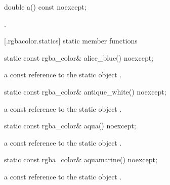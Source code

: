 %
%
\begin{itemdecl}
	double a() const noexcept;
\end{itemdecl}
\begin{itemdescr}
	\pnum
	\returns
	.
\end{itemdescr}

 [\iotwod.rgbacolor.statics] { static member functions}

\begin{itemdecl}
    static const rgba_color& alice_blue() noexcept;
\end{itemdecl}
\begin{itemdescr}
    \pnum
    \returns
    a const reference to the static  object .
\end{itemdescr}

\begin{itemdecl}
    static const rgba_color& antique_white() noexcept;
\end{itemdecl}
\begin{itemdescr}
    \pnum
    \returns
    a const reference to the static  object .
\end{itemdescr}

\begin{itemdecl}
    static const rgba_color& aqua() noexcept;
\end{itemdecl}
\begin{itemdescr}
    \pnum
    \returns
    a const reference to the static  object .
\end{itemdescr}

\begin{itemdecl}
    static const rgba_color& aquamarine() noexcept;
\end{itemdecl}
\begin{itemdescr}
    \pnum
    \returns
    a const reference to the static  object .
\end{itemdescr}

